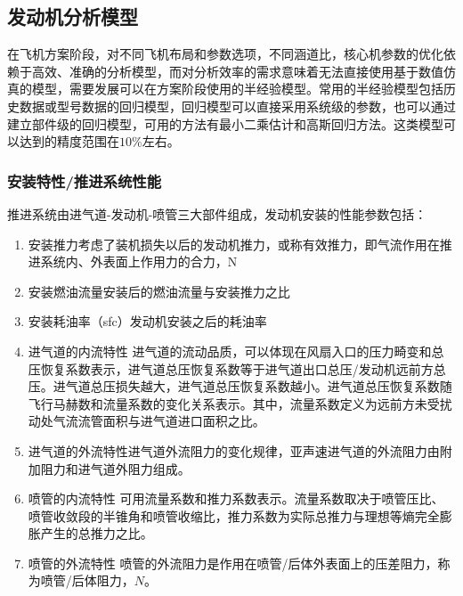 \documentclass[12pt,a4paper]{report}
\begin{document}
\subsection{发动机分析模型}

在飞机方案阶段，对不同飞机布局和参数选项，不同涵道比，核心机参数的优化依赖于高效、准确的分析模型，而对分析效率的需求意味着无法直接使用基于数值仿真的模型，需要发展可以在方案阶段使用的半经验模型。常用的半经验模型包括历史数据或型号数据的回归模型，回归模型可以直接采用系统级的参数，也可以通过建立部件级的回归模型，可用的方法有最小二乘估计和高斯回归方法。这类模型可以达到的精度范围在$10\%$左右。

%
%
%


\subsubsection{安装特性/推进系统性能}

推进系统由进气道-发动机-喷管三大部件组成，发动机安装的性能参数包括：

\begin{enumerate}
\item 安装推力\textemdash 考虑了装机损失以后的发动机推力，或称有效推力，即气流作用在推进系统内、外表面上作用力的合力，N
\item 安装燃油流量\textemdash 安装后的燃油流量与安装推力之比

\item 安装耗油率（sfc）\textemdash 发动机安装之后的耗油率

\item 进气道的内流特性 \textemdash 进气道的流动品质，可以体现在风扇入口的压力畸变和总压恢复系数表示，进气道总压恢复系数等于进气道出口总压/发动机远前方总压。进气道总压损失越大，进气道总压恢复系数越小。进气道总压恢复系数随飞行马赫数和流量系数的变化关系表示。其中，流量系数定义为远前方未受扰动处气流流管面积与进气道进口面积之比。

\item 进气道的外流特性\textemdash 进气道外流阻力的变化规律，亚声速进气道的外流阻力由附加阻力和进气道外阻力组成。

\item 喷管的内流特性 \textemdash 可用流量系数和推力系数表示。流量系数取决于喷管压比、喷管收敛段的半锥角和喷管收缩比，推力系数为实际总推力与理想等熵完全膨胀产生的总推力之比。

\item 喷管的外流特性 \textemdash 喷管的外流阻力是作用在喷管/后体外表面上的压差阻力，称为喷管/后体阻力，$N$。
\end{enumerate}
\end{document}
